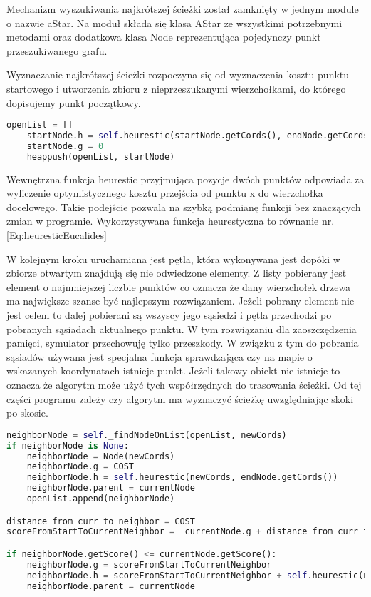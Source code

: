 Mechanizm wyszukiwania najkrótszej ścieżki został zamknięty w jednym module o nazwie aStar.
Na moduł składa się klasa AStar ze wszystkimi potrzebnymi metodami oraz dodatkowa klasa Node reprezentująca 
pojedynczy punkt przeszukiwanego grafu.

Wyznaczanie najkrótszej ścieżki rozpoczyna się od wyznaczenia kosztu punktu startowego i utworzenia zbioru z nieprzeszukanymi 
wierzchołkami, do którego dopisujemy punkt początkowy. 
\begin{lstlisting}[language=Python,caption=Przygotowanie danych,label={kodPython}]
    openList = []
    startNode.h = self.heurestic(startNode.getCords(), endNode.getCords())
    startNode.g = 0
    heappush(openList, startNode)
\end{lstlisting}

Wewnętrzna funkcja heurestic przyjmująca pozycje dwóch punktów odpowiada
za wyliczenie optymistycznego kosztu przejścia od punktu x do wierzchołka docelowego.
Takie podejście pozwala na szybką podmianę funkcji bez znaczących zmian w programie.
Wykorzystywana funkcja heurestyczna to równanie nr. \eqref{Eq:heuresticEucalides} 

W kolejnym kroku uruchamiana jest pętla, która wykonywana jest dopóki
w zbiorze otwartym znajdują się nie odwiedzone elementy. Z listy pobierany jest 
element o najmniejszej liczbie punktów co oznacza że dany wierzchołek drzewa ma największe szanse być najlepszym rozwiązaniem.
Jeżeli pobrany element nie jest celem to dalej pobierani są wszyscy jego sąsiedzi i pętla przechodzi po pobranych sąsiadach aktualnego punktu. 
W tym rozwiązaniu dla zaoszczędzenia pamięci, symulator przechowuję tylko przeszkody.
W związku z tym do pobrania sąsiadów używana jest specjalna funkcja sprawdzająca czy na mapie o wskazanych koordynatach istnieje punkt. 
Jeżeli takowy obiekt nie istnieje to oznacza że algorytm może użyć tych współrzędnych do trasowania ścieżki. 
Od tej części programu zależy czy algorytm ma wyznaczyć ścieżkę uwzględniając skoki po skosie.

\begin{lstlisting}[language=Python,caption=Wyznaczenie kosztu ścieżki,label={kodPython2}]
neighborNode = self._findNodeOnList(openList, newCords)
if neighborNode is None:
    neighborNode = Node(newCords)
    neighborNode.g = COST
    neighborNode.h = self.heurestic(newCords, endNode.getCords())
    neighborNode.parent = currentNode
    openList.append(neighborNode)

distance_from_curr_to_neighbor = COST
scoreFromStartToCurrentNeighbor =  currentNode.g + distance_from_curr_to_neighbor

if neighborNode.getScore() <= currentNode.getScore():
    neighborNode.g = scoreFromStartToCurrentNeighbor
    neighborNode.h = scoreFromStartToCurrentNeighbor + self.heurestic(newCords, endNode.getCords())     
    neighborNode.parent = currentNode
\end{lstlisting}

